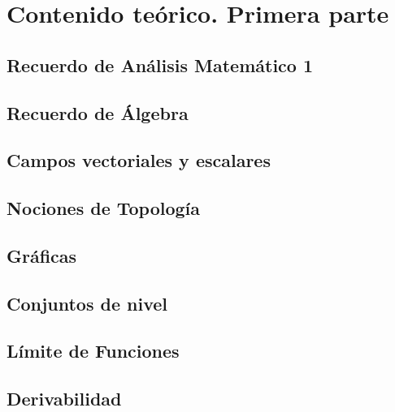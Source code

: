 \documentclass[10pt, a4paper]{report}
\begin{document}
    \chapter{Contenido teórico. Primera parte}
        \section{Recuerdo de Análisis Matemático 1}
          
        
         \section{Recuerdo de Álgebra}
           
         
         \section{Campos vectoriales y escalares}
            
                  
        \section{Nociones de Topolog\'ia}
            
      
        \section{Gráficas}
            
            
        \section{Conjuntos de nivel}
            
         
       \section{L\'imite de Funciones}
          
          
        \section{Derivabilidad}
            
\end{document}
